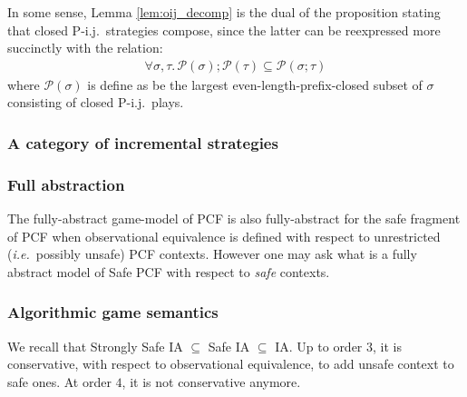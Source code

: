In some sense, Lemma \ref{lem:oij_decomp} is the dual of the proposition stating that closed P-i.j.\
strategies compose, since  the latter can be reexpressed more succinctly with the relation:
\begin{eqnarray}
     \forall \sigma, \tau .\, \mathcal{P}(\sigma) ; \mathcal{P}(\tau) \subseteq \mathcal{P}(\sigma ; \tau)
     \label{eqn:pijcomp_1}
\end{eqnarray}
where $\mathcal{P}(\sigma)$ is define as be the largest even-length-prefix-closed subset of $\sigma$ consisting of closed P-i.j.\ plays.

\subsubsection{A category of incremental strategies}


\subsubsection{Full abstraction}

The fully-abstract game-model of PCF is also fully-abstract for the
safe fragment of PCF when observational equivalence is defined with
respect to unrestricted ({\it i.e.}~possibly unsafe) PCF contexts.
However one may ask what is a fully abstract model of Safe PCF with
respect to \emph{safe} contexts.





\subsubsection{Algorithmic game semantics}
We recall that Strongly Safe IA $\subseteq$ Safe IA $\subseteq$ IA.
Up to order $3$, it is conservative, with respect to observational equivalence, to add unsafe context to safe ones.
At order $4$, it is not conservative anymore.

